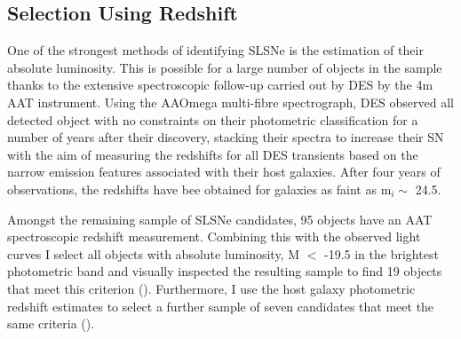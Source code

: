 \subsection{Selection Using Redshift}
One of the strongest methods of identifying SLSNe is the estimation of their absolute luminosity. This is possible for a large number of objects in the sample thanks to the extensive spectroscopic follow-up carried out by DES by the 4m AAT instrument. Using the AAOmega multi-fibre spectrograph, DES observed all detected object with no constraints on their photometric classification for a number of years after their discovery, stacking their spectra to increase their S\/N with the aim of measuring the redshifts for all DES transients based on the narrow emission features associated with their host galaxies. After four years of observations, the redshifts have bee obtained for galaxies as faint as m$_i \sim$ 24.5.

Amongst the remaining sample of SLSNe candidates, 95 objects have an AAT spectroscopic redshift measurement. Combining this with the observed light curves I select all objects with absolute luminosity, M $<$ -19.5 in the brightest photometric band and visually inspected the resulting sample to find 19 objects that meet this criterion (). Furthermore, I use the host galaxy photometric redshift estimates to select a further sample of seven candidates that meet the same criteria ().

